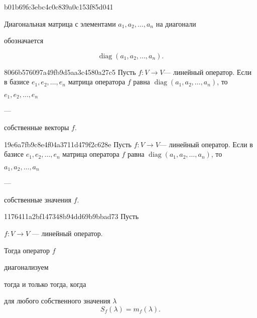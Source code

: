 \begin{note}{b01b69fc3ebc4c0c839a0c153f85d041}
    \begin{icloze}{1}Диагональная матрица с элементами \( a_1, a_2, \ldots, a_n \) на диагонали\end{icloze} обозначается
    \begin{icloze}{2}
        \[
            \operatorname{diag}(a_1, a_2, \ldots, a_n).
        \]
    \end{icloze}
\end{note}

\begin{note}{8066b576097a49fb9d5aa3c4580a27c5}
    Пусть \( f : V \to V \)--- линейный оператор.
    Если в базисе \( e_1, e_2, \ldots, e_n \) матрица оператора \( f \) равна \( \operatorname{diag} (a_1, a_2, \ldots, a_n) \), то \begin{icloze}{2}\( e_1, e_2, \ldots, e_n \)\end{icloze} --- \begin{icloze}{1}собственные векторы \( f \).\end{icloze}
\end{note}

\begin{note}{19e6a7fb9c8e4f04a3711d479f2c628e}
    Пусть \( f : V \to V \)--- линейный оператор.
    Если в базисе \( e_1, e_2, \ldots, e_n \) матрица оператора \( f \) равна \( \operatorname{diag} (a_1, a_2, \ldots, a_n) \), то \begin{icloze}{2}\( a_1, a_2, \ldots, a_n \)\end{icloze} --- \begin{icloze}{1}собственные значения \( f \).\end{icloze}
\end{note}

\begin{note}{1176411a2bf147348b94dd69b9bbad73}
    Пусть \begin{icloze}{4}\( f : V \to V \) --- линейный оператор.\end{icloze} Тогда оператор \( f \) \begin{icloze}{2}диагонализуем\end{icloze} \begin{icloze}{3}тогда и только тогда, когда\end{icloze} \begin{icloze}{1}для любого собственного значения \( \lambda \)
    \[
        S_f(\lambda) = m_f(\lambda).
    \]\end{icloze}
\end{note}

